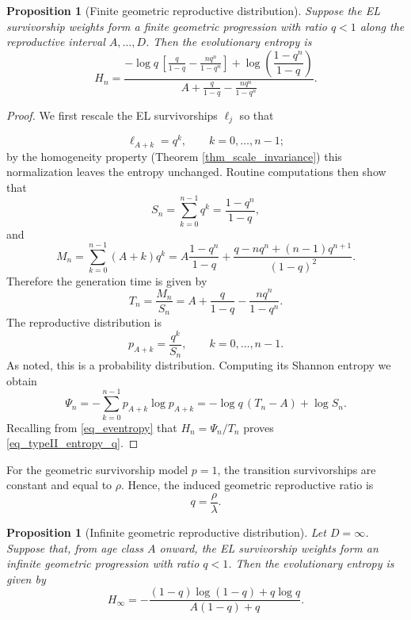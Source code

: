 \documentclass[10pt,a4paper]{amsart}
\newtheorem{prop}[thm]{Proposition}
\theoremstyle{definition}
\theoremstyle{remark}
\numberwithin{equation}{section}
\begin{document}
\begin{prop}[Finite geometric reproductive distribution]
	\label{prop_geometric}
Suppose the
EL survivorship weights form a finite geometric progression
with ratio \(q <1\) along the reproductive interval \(A,\dots,D\). Then the evolutionary entropy is
\begin{equation}
\label{eq_typeII_entropy_q}
H_n
=
\frac{
-\log q\,
\left[
\displaystyle
\frac{q}{1-q}
-
\frac{nq^n}{1-q^n}
\right]
+
\log\left(
\dfrac{1-q^n}{1-q}
\right)
}{
A
+
\displaystyle
\frac{q}{1-q}
-
\displaystyle
\frac{nq^n}{1-q^n}
}.
\end{equation}
\end{prop}

\begin{proof}
	We first rescale the EL survivorships $\ell_j$ so that 
	
	\begin{equation}
		\label{eq_typeII_discounted_profile}
		\ell_{A+k}
		=
		q^k,
		\qquad
		k=0,\ldots,n-1;
	\end{equation}
by the homogeneity property (Theorem \ref{thm_scale_invariance}) this normalization leaves the entropy unchanged.
	Routine computations then show that 
\[
S_n
=
\sum_{k=0}^{n-1}q^k
=
\frac{1-q^n}{1-q},
\]
and
\[
M_n
=
\sum_{k=0}^{n-1}(A+k)q^k
=
A\frac{1-q^n}{1-q}
+
\frac{
q-nq^n+(n-1)q^{n+1}
}{
(1-q)^2
}.
\]
Therefore the generation time is given by
\[
T_n
=
\frac{M_n}{S_n}
=
A
+
\frac{q}{1-q}
-
\frac{nq^n}{1-q^n}.
\]
The reproductive distribution is
\[
p_{A+k}
=
\frac{q^k}{S_n},
\qquad
k=0,\ldots,n-1.
\]
As noted, this is a probability distribution. Computing its Shannon entropy we obtain
\[
\Psi_n
=
-\sum_{k=0}^{n-1}p_{A+k}\log p_{A+k}
=
-\log q\,(T_n-A)+\log S_n.
\]
Recalling from \eqref{eq_eventropy} that
\(H_n=\Psi_n/T_n\) proves \eqref{eq_typeII_entropy_q}.
\end{proof}

For the geometric survivorship model \(p=1\), the transition
survivorships are constant and equal to \(\rho\). Hence, the induced 
geometric reproductive ratio is
\begin{equation}
\label{eq_q_rho_lambda}
q
=
\frac{\rho}{\lambda}.
\end{equation}

\begin{prop}[Infinite geometric reproductive distribution]
Let $D=\infty$. Suppose that, from age class \(A\) onward, the EL survivorship
weights form an infinite geometric progression with ratio
\(q<1\). Then 
the evolutionary entropy is given by
\begin{equation}
\label{eq_typeII_open_entropy_q_compact}
H_\infty
=
-\frac{
(1-q)\log(1-q)
+
q\log q
}{
A(1-q)+q
}.
\end{equation}
\end{prop}
\end{document}
